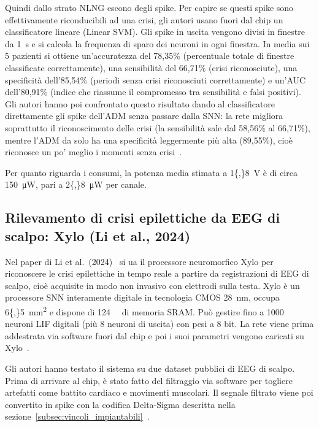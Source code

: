 Quindi dallo strato NLNG escono degli spike. Per capire se questi spike sono effettivamente riconducibili ad una crisi, gli autori usano fuori dal chip un classificatore lineare (Linear SVM). Gli spike in uscita vengono divisi in finestre da \SI{1}{\second} e si calcola la frequenza di sparo dei neuroni in ogni finestra. In media sui 5 pazienti si ottiene un'accuratezza del 78,35\% (percentuale totale di finestre classificate correttamente), una sensibilità del 66,71\% (crisi riconosciute), una specificità dell'85,54\% (periodi senza crisi riconosciuti correttamente) e un'AUC dell'80,91\% (indice che riassume il compromesso tra sensibilità e falsi positivi). Gli autori hanno poi confrontato questo risultato dando al classificatore direttamente gli spike dell'ADM senza passare dalla SNN: la rete migliora soprattutto il riconoscimento delle crisi (la sensibilità sale dal 58,56\% al 66,71\%), mentre l'ADM da solo ha una specificità leggermente più alta (89,55\%), cioè riconosce un po' meglio i momenti senza crisi~\cite{bartels2025}.

Per quanto riguarda i consumi, la potenza media stimata a \SI{1{,}8}{\volt} è di circa \SI{150}{\micro\watt}, pari a \SI{2{,}8}{\micro\watt} per canale\cite{bartels2025}.

\subsection{Rilevamento di crisi epilettiche da EEG di scalpo: Xylo (Li et al., 2024)}
\label{subsec:xylo_app}

Nel paper di Li et al.\ (2024)~\cite{li2024} si ua il processore neuromorfico Xylo per riconoscere le crisi epilettiche in tempo reale a partire da registrazioni di EEG di scalpo, cioè acquisite in modo non invasivo con elettrodi sulla testa. Xylo è un processore SNN interamente digitale in tecnologia CMOS \SI{28}{\nano\meter}, occupa \SI{6{,}5}{\milli\meter\squared} e dispone di \SI{124}{\kilo\byte} di memoria SRAM. Può gestire fino a 1000 neuroni LIF digitali (più 8 neuroni di uscita) con pesi a 8 bit. La rete viene prima addestrata via software fuori dal chip e poi i suoi parametri vengono caricati su Xylo~\cite{li2024}.

Gli autori hanno testato il sistema su due dataset pubblici di EEG di scalpo. Prima di arrivare al chip, è stato fatto del filtraggio via software per togliere artefatti come battito cardiaco e movimenti muscolari. Il segnale filtrato viene poi convertito in spike con la codifica Delta-Sigma descritta nella sezione~\ref{subsec:vincoli_impiantabili}~\cite{li2024}.

